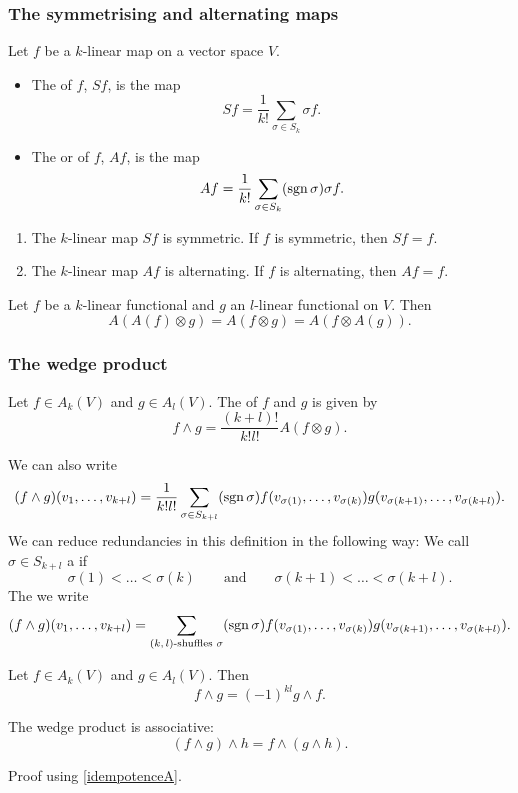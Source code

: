 \subsubsection{The symmetrising and alternating maps}
\begin{definition}
Let $f$ be a $k$-linear map on a vector space $V$.
\begin{itemize}
\item The  of $f$, $Sf$, is the map
\[ Sf = \frac{1}{k!}\sum_{\sigma\in S_k}\sigma f. \]
\item The  or  of $f$, $Af$, is the map
\[ Af = \frac{1}{k!}\sum_{\sigma\in S_k}(\operatorname{sgn} \sigma)\sigma f. \]
\end{itemize}
\end{definition}
\begin{lemma}
\begin{enumerate}
\item The $k$-linear map $Sf$ is symmetric. If $f$ is symmetric, then $Sf = f$.
\item The $k$-linear map $Af$ is alternating. If $f$ is alternating, then $Af = f$.
\end{enumerate}
\end{lemma}
\begin{lemma} \label{idempotenceA}
Let $f$ be a $k$-linear functional and $g$ an $l$-linear functional on $V$. Then
\[ A(A(f)\otimes g) = A(f\otimes g) = A(f\otimes A(g)). \]
\end{lemma}
\subsubsection{The wedge product}
\begin{definition}
Let $f\in A_k(V)$ and $g\in A_l(V)$. The  of $f$ and $g$ is given by
\[ f\wedge g = \frac{(k+l)!}{k!l!}A(f\otimes g). \]
\end{definition}
We can also write
\[ (f\wedge g)(v_1,\ldots,v_{k+l}) = \frac{1}{k!l!}\sum_{\sigma\in S_{k+l}}(\operatorname{sgn} \sigma)f(v_{\sigma(1)},\ldots,v_{\sigma(k)})g(v_{\sigma(k+1)},\ldots, v_{\sigma(k+l)}). \]
We can reduce redundancies in this definition in the following way:
We call $\sigma\in S_{k+l}$ a  if
\[ \sigma(1)<\ldots<\sigma(k) \qquad \text{and}\qquad \sigma(k+1)<\ldots<\sigma(k+l). \]
The we write
\[ (f\wedge g)(v_1,\ldots,v_{k+l}) = \sum_{\text{$(k,l)$-shuffles $\sigma$}}(\operatorname{sgn} \sigma)f(v_{\sigma(1)},\ldots,v_{\sigma(k)})g(v_{\sigma(k+1)},\ldots, v_{\sigma(k+l)}). \]
\begin{proposition}
Let $f\in A_k(V)$ and $g\in A_l(V)$. Then
\[ f\wedge g = (-1)^{kl}g\wedge f. \]
\end{proposition}
\begin{lemma}
The wedge product is associative:
\[ (f\wedge g)\wedge h = f\wedge (g\wedge h). \]
\end{lemma}
Proof using \ref{idempotenceA}.

